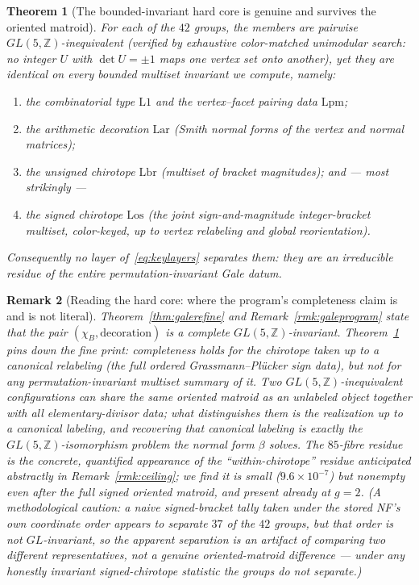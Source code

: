 \documentclass{amsart}
\newtheorem{theorem}{Theorem}[section]
\newtheorem{remark}[theorem]{Remark}
\begin{document}
\begin{theorem}[The bounded-invariant hard core is genuine and survives the
oriented matroid]\label{thm:hardcore}
For each of the $42$ groups, the members are pairwise
$GL(5,\mathbb Z)$-\emph{inequivalent} (verified by exhaustive color-matched
unimodular search: no integer $U$ with $\det U=\pm1$ maps one vertex set onto
another), yet they are \emph{identical} on every bounded multiset invariant we
compute, namely:
\begin{enumerate}
  \item[\textnormal{(i)}] the combinatorial type $\mathrm{L1}$ and the
        vertex--facet pairing data $\mathrm{Lpm}$;
  \item[\textnormal{(ii)}] the arithmetic decoration $\mathrm{Lar}$ (Smith normal
        forms of the vertex and normal matrices);
  \item[\textnormal{(iii)}] the unsigned chirotope $\mathrm{Lbr}$ (multiset of
        bracket magnitudes); and --- most strikingly ---
  \item[\textnormal{(iv)}] the \emph{signed} chirotope $\mathrm{Los}$ (the joint
        sign-and-magnitude integer-bracket multiset, color-keyed, up to vertex
        relabeling and global reorientation).
\end{enumerate}
Consequently no layer of~\eqref{eq:keylayers} separates them: they are an
irreducible residue of the entire \emph{permutation-invariant} Gale datum.
\end{theorem}

\begin{remark}[Reading the hard core: where the program's completeness claim is
and is not literal]\label{rmk:hardcore}
Theorem~\ref{thm:galerefine} and Remark~\ref{rmk:galeprogram} state that the pair
$(\chi_B,\text{decoration})$ is a \emph{complete} $GL(5,\mathbb Z)$-invariant.
Theorem~\ref{thm:hardcore} pins down the fine print: completeness holds for the
chirotope taken \emph{up to a canonical relabeling} (the full ordered
Grassmann--Plücker sign data), but \emph{not} for any
\emph{permutation-invariant multiset summary} of it. Two
$GL(5,\mathbb Z)$-inequivalent configurations can share the same oriented matroid
\emph{as an unlabeled object} together with all elementary-divisor data; what
distinguishes them is the realization \emph{up to a canonical labeling}, and
recovering that canonical labeling is exactly the
$GL(5,\mathbb Z)$-isomorphism problem the normal form $\beta$ solves. The
$85$-fibre residue is the concrete, quantified appearance of the
``within-chirotope'' residue anticipated abstractly in
Remark~\ref{rmk:ceiling}; we find it is small ($9.6\times10^{-7}$) but
\emph{nonempty even after the full signed oriented matroid}, and present already
at $g=2$. (A methodological caution: a naive signed-bracket tally taken under the
\emph{stored NF's own coordinate order} appears to separate $37$ of the $42$
groups, but that order is not $GL$-invariant, so the apparent separation is an
artifact of comparing two different representatives, not a genuine
oriented-matroid difference --- under any honestly invariant signed-chirotope
statistic the groups do \emph{not} separate.)
\end{remark}
\end{document}
